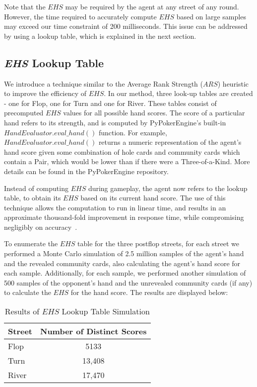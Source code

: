 \documentclass{article}
\begin{document}
Note that the $EHS$ may be required by the agent at any street of any round. However, the time required to accurately compute $EHS$ based on large samples may exceed our time constraint of 200 milliseconds. This issue can be addressed by using a lookup table, which is explained in the next section.

\subsection{\textbf{\textit{EHS}} Lookup Table}

We introduce a technique similar to the Average Rank Strength ($ARS$) heuristic~\cite{trc:ars} to improve the efficiency of $EHS$. In our method, three look-up tables are created - one for Flop, one for Turn and one for River. These tables consist of precomputed $EHS$ values for all possible hand scores. The score of a particular hand refers to its strength, and is computed by PyPokerEngine's built-in $HandEvaluator.eval\_hand()$ function. For example, $HandEvaluator.eval\_hand()$ returns a numeric representation of the agent's hand score given some combination of hole cards and community cards which contain a Pair, which would be lower than if there were a Three-of-a-Kind. More details can be found in the PyPokerEngine repository.

Instead of computing $EHS$ during gameplay, the agent now refers to the lookup table, to obtain its $EHS$ based on its current hand score. The use of this technique allows the computation to run in linear time, and results in an approximate thousand-fold improvement in response time, while compromising negligibly on accuracy~\cite{trc:ars}.

To enumerate the $EHS$ table for the three postflop streets, for each street we performed a Monte Carlo simulation of 2.5 million samples of the agent's hand and the revealed community cards, also calculating the agent's hand score for each sample. Additionally, for each sample, we performed another simulation of 500 samples of the opponent's hand and the unrevealed community cards (if any) to calculate the $EHS$ for the hand score. The results are displayed below:

\begin{table}[h!]
  \begin{center}
    \begin{tabular}{l|c}
      \textbf{Street} & \textbf{Number of Distinct Scores} \\
      \hline
      Flop & 5133 \\
      Turn & 13,408 \\
      River & 17,470 \\
    \end{tabular}
    \caption{Results of $EHS$ Lookup Table Simulation}
    \label{tab:table2}
  \end{center}
\end{table}
\end{document}
